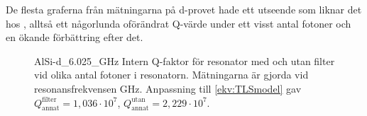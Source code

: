\documentclass[main.tex]{subfiles}
\begin{document}
De flesta graferna från mätningarna på d-provet hade ett utseende som liknar det hos , alltså ett någorlunda oförändrat Q-värde under ett visst antal fotoner och en ökande förbättring efter det.

\begin{figure}[H]
  \centering
  \setlength{}
  \setlength\figureheight{15em}
  
  \caption{AlSi-d\_6.025\_GHz Intern Q-faktor för resonator med och utan filter vid olika antal fotoner i resonatorn. Mätningarna är gjorda vid resonansfrekvensen \unit[6,025]{GHz}. Anpassning till \ref{ekv:TLSmodel} gav $Q_{\text{annat}}^{\text{filter}}=1,036\cdot10^7$, $Q_{\text{annat}}^{\text{utan}}=2,229\cdot10^7$.}
  \label{fig:d6.025}
\end{figure}
\fi
\end{document}
